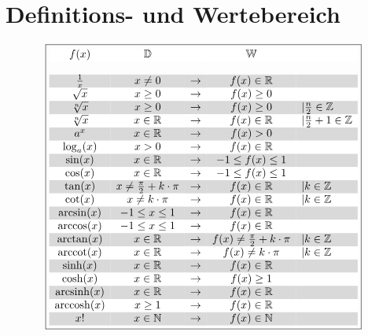 \section{Definitions- und Wertebereich}
\[ \boxed{\begin{array}{ccccl}
\rowcolor{white} f(x)
  & \mathbb{D}
  & 
  & \mathbb{W}
  & 
  \\\\
\rowcolor{lgray} \frac{1}{x} 
  & x \neq 0 
  & \rightarrow
  & f(x) \in \mathbb{R}
  & 
  \\
\rowcolor{white} \sqrt{x}    
  & x \geq 0 
  & \rightarrow
  & f(x) \geq 0
  & 
  \\
\rowcolor{lgray} \sqrt[n]{x} 
  & x \geq 0 
  & \rightarrow
  & f(x) \geq 0
  & \vert \frac{n}{2} \in \mathbb{Z} 
  \\
\rowcolor{white} \sqrt[n]{x} 
  & x \in \mathbb{R} 
  & \rightarrow
  & f(x) \in \mathbb{R}
  & \vert \frac{n}{2} + 1 \in \mathbb{Z} 
  \\
\rowcolor{lgray} a^x
  & x \in \mathbb{R}
  & \rightarrow
  & f(x) > 0
  & 
  \\
\rowcolor{white} \log_{a}(x)      
  & x > 0 
  & \rightarrow
  & f(x) \in \mathbb{R}
  & 
  \\
\rowcolor{lgray} \sin(x)     
  & x \in \mathbb{R} 
  & \rightarrow
  & -1 \leq f(x) \leq 1
  & 
  \\
\rowcolor{white} \cos(x)     
  & x \in \mathbb{R} 
  & \rightarrow
  & -1 \leq f(x) \leq 1
  & 
  \\
\rowcolor{lgray} \tan(x) 
  & x \neq \frac{\pi}{2} + k \cdot \pi 
  & \rightarrow
  & f(x) \in \mathbb{R}
  & \vert k \in \mathbb{Z} 
  \\
\rowcolor{white} \cot(x) 
  & x \neq k \cdot \pi 
  & \rightarrow
  & f(x) \in \mathbb{R}
  & \vert k \in \mathbb{Z} 
  \\
\rowcolor{lgray} \arcsin(x) 
  & -1 \leq x \leq 1 
  & \rightarrow
  & f(x) \in \mathbb{R}
  & 
  \\
\rowcolor{white} \arccos(x) 
  & -1 \leq x \leq 1 
  & \rightarrow
  & f(x) \in \mathbb{R}
  & 
  \\
\rowcolor{lgray} \arctan(x)  
  & x \in \mathbb{R} 
  & \rightarrow
  & f(x) \neq \frac{\pi}{2} + k \cdot \pi
  & | k \in \mathbb{Z} 
  \\
\rowcolor{white} \arccot(x)  
  & x \in \mathbb{R} 
  & \rightarrow
  & f(x) \neq k \cdot \pi
  & | k \in \mathbb{Z} 
  \\
\rowcolor{lgray} \sinh(x)
  & x \in \mathbb{R}
  & \rightarrow
  & f(x) \in \mathbb{R}
  & 
  \\
\rowcolor{white} \cosh(x)
  & x \in \mathbb{R}
  & \rightarrow
  & f(x) \geq 1
  & 
  \\
\rowcolor{lgray} \arcsinh(x) 
  & x \in \mathbb{R} 
  & \rightarrow
  & f(x) \in \mathbb{R}
  & 
  \\
\rowcolor{white} \arccosh(x) 
  & x \geq 1 
  & \rightarrow
  & f(x) \in \mathbb{R}
  & 
  \\
\rowcolor{lgray} x!          
  & x \in \mathbb{N} 
  & \rightarrow
  & f(x) \in \mathbb{N}
  & 
  \\
\end{array}} \]
